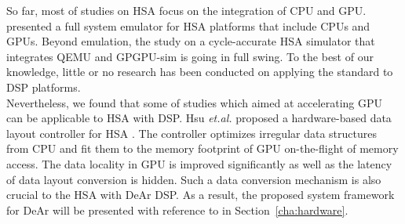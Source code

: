     So far, most of studies on HSA focus on the integration of CPU and GPU. 
    \cite{hsaemu} presented a full system emulator for HSA platforms that include CPUs and GPUs.
    Beyond emulation, the study on a cycle-accurate HSA simulator that integrates QEMU \cite{qemu} and GPGPU-sim \cite{gpgpusim} is going in full swing.
    To the best of our knowledge, little or no research has been conducted on applying the standard to DSP platforms.
    \\\indent
    Nevertheless, we found that some of studies which aimed at accelerating GPU can be applicable to HSA with DSP.
    Hsu \textit{et.al.} proposed a hardware-based data layout controller for HSA \cite{sc}.
    The controller optimizes irregular data structures from CPU and fit them to the memory footprint of GPU on-the-flight of memory access.
    The data locality in GPU is improved significantly as well as the latency of data layout conversion is hidden.
    Such a data conversion mechanism is also crucial to the HSA with DeAr DSP.
    As a result, the proposed system framework for DeAr will be presented with reference to \cite{sc} in Section~\ref{cha:hardware}.
